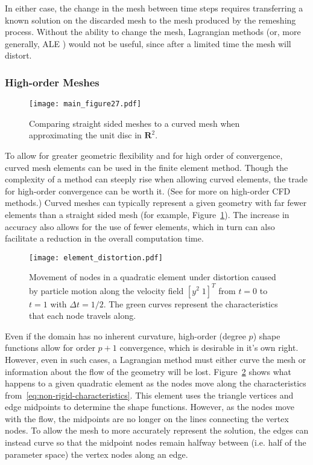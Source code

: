 \documentclass[letterpaper,10pt]{article}
\theoremstyle{definition}
\newcommand{\reals}{\mathbf{R}}
\begin{document}
In either case, the change in the
mesh between time steps requires transferring a known solution on the
discarded mesh to the mesh produced by the remeshing process. Without
the ability to change the mesh, Lagrangian methods (or, more generally,
ALE \cite{Hirt1974}) would not be useful, since after a limited time the
mesh will distort.

\subsubsection{High-order Meshes}

\begin{figure}
  \texttt{[image: main\_figure27.pdf]}
  \centering
  \captionsetup{width=.75\linewidth}
  \caption{Comparing straight sided meshes to a curved mesh when approximating
    the unit disc in \(\reals^2\).}
  \label{fig:curved-vs-straight-mesh}
\end{figure}

To allow for greater geometric flexibility and for high order of convergence,
curved mesh elements can be used in the finite element method. Though the
complexity of a method can steeply rise when allowing curved elements, the
trade for high-order convergence can be worth it. (See \cite{Wang2013} for
more on high-order CFD methods.) Curved meshes can typically
represent a given geometry with far fewer elements than a straight sided mesh
(for example, Figure~\ref{fig:curved-vs-straight-mesh}).
The increase in accuracy also allows for the use of fewer elements, which
in turn can also facilitate a reduction in the overall computation time.

\begin{figure}
  \texttt{[image: element\_distortion.pdf]}
  \centering
  \captionsetup{width=.75\linewidth}
  \caption{Movement of nodes in a quadratic element under distortion caused
    by particle motion along the velocity field \(\left[ y^2 \; 1 \right]^T\)
    from \(t = 0\) to \(t = 1\) with \(\Delta t = 1/2\). The green curves
    represent the characteristics that each node travels along.}
  \label{fig:element-distortion}
\end{figure}

Even if the domain has no inherent curvature, high-order (degree \(p\)) shape
functions allow for order \(p + 1\) convergence, which is desirable in
it's own right. However, even in such cases, a Lagrangian method must either
curve the mesh or information about the flow of the geometry will be lost.
Figure~\ref{fig:element-distortion} shows what happens to a given
quadratic element as the nodes move along the
characteristics from~\eqref{eq:non-rigid-characteristics}.
This element uses the triangle vertices and edge
midpoints to determine the shape functions. However, as the nodes move
with the flow, the midpoints are no longer on the lines connecting
the vertex nodes. To allow the mesh to more accurately represent the
solution, the edges can instead curve so that the midpoint nodes remain
halfway between (i.e. half of the parameter space) the vertex nodes along
an edge.
\end{document}
